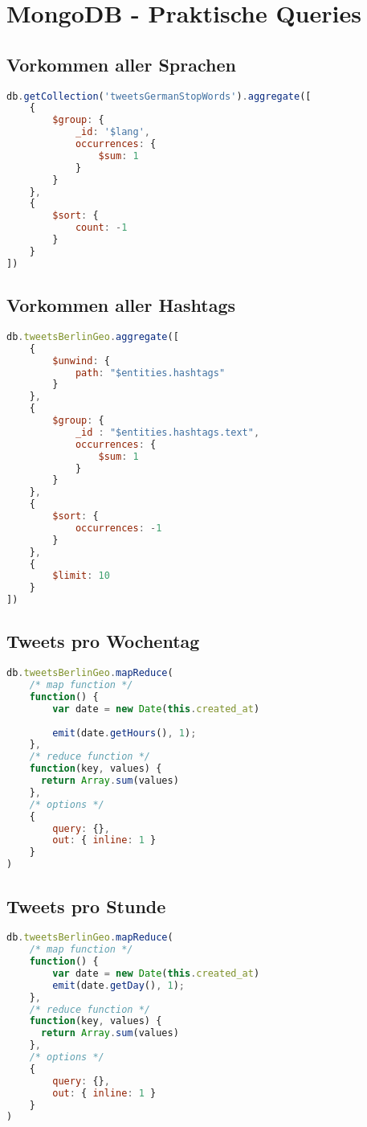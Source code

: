 \documentclass[12pt, 
	a4paper, 
	oneside, 
	leqno]{scrreprt}
\begin{document}
\section{MongoDB - Praktische Queries}

\subsection{Vorkommen aller Sprachen}
\begin{lstlisting}[language=JavaScript]
db.getCollection('tweetsGermanStopWords').aggregate([
    { 
        $group: { 
            _id: '$lang',
            occurrences: {
                $sum: 1
            }
        }
    },
    {
        $sort: {
            count: -1
        }
    }
])
\end{lstlisting}

\subsection{Vorkommen aller Hashtags}
\begin{lstlisting}[language=JavaScript]
db.tweetsBerlinGeo.aggregate([  
    { 
        $unwind: {
            path: "$entities.hashtags"
        }
    },
    { 
        $group: { 
            _id : "$entities.hashtags.text",
            occurrences: {
                $sum: 1
            }
        }
    },
    {
        $sort: {
            occurrences: -1 
        }
    },
    {
        $limit: 10
    }
])
\end{lstlisting}

\subsection{Tweets pro Wochentag}
\begin{lstlisting}[language=JavaScript]
db.tweetsBerlinGeo.mapReduce(
	/* map function */
	function() {
		var date = new Date(this.created_at)
	  
		emit(date.getHours(), 1);
	},
	/* reduce function */
	function(key, values) {
	  return Array.sum(values)
	},
	/* options */
	{
		query: {},
		out: { inline: 1 }
	}
)
\end{lstlisting}

\subsection{Tweets pro Stunde}
\begin{lstlisting}[language=JavaScript]
db.tweetsBerlinGeo.mapReduce(
	/* map function */
	function() {
		var date = new Date(this.created_at)
		emit(date.getDay(), 1);
	},
	/* reduce function */
	function(key, values) {
	  return Array.sum(values)
	},
	/* options */
	{
		query: {},
		out: { inline: 1 }
	}
)
\end{lstlisting}
\end{document}
